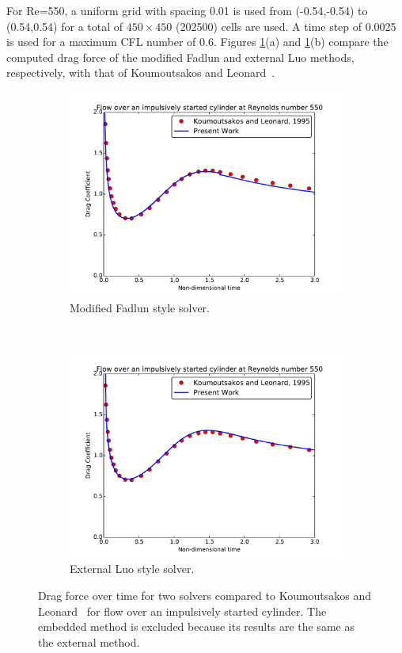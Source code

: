 For Re=550, a uniform grid with spacing 0.01 is used from (-0.54,-0.54) to (0.54,0.54) for a total of $450\times450$ (202500) cells are used. 
A time step of 0.0025 is used for a maximum CFL number of 0.6.
Figures \ref{fig:cy550}(a) and \ref{fig:cy550}(b) compare the computed drag force of the modified Fadlun and external Luo methods, respectively, with that of Koumoutsakos and Leonard~\cite{Koumoutsakos:1995bf}.
\begin{figure}[!htb]
	\centering
	\begin{subfigure}{0.4\textwidth}
		\includegraphics[width=\linewidth]{cy550fadlun}
		\caption{Modified Fadlun style solver.}
	\end{subfigure}
	~
	\begin{subfigure}{0.4\textwidth}
		\includegraphics[width=\linewidth]{cy550luo}
		\caption{External Luo style solver.}
	\end{subfigure}
	\caption{Drag force over time for two solvers compared to Koumoutsakos and Leonard~\cite{Koumoutsakos:1995bf} for flow over an impulsively started cylinder. The embedded method is excluded because its results are the same as the external method.}
	\label{fig:cy550}
\end{figure}

